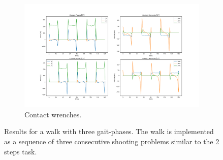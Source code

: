 \begin{figure}[h!]\ContinuedFloat
\begin{subfigure}{1\textwidth}
  \centering
\includegraphics[width=1\linewidth]{Media/Crocoddyl/RH5Legs/RH5Gait_ContactWrenches.png}
\caption{Contact wrenches.}
\end{subfigure}
\caption{Results for a walk with three gait-phases. The walk is implemented as a sequence of three  consecutive shooting problems similar to the 2 steps task.}
\label{fig:rh5_full_gait}
\centering
\end{figure}

